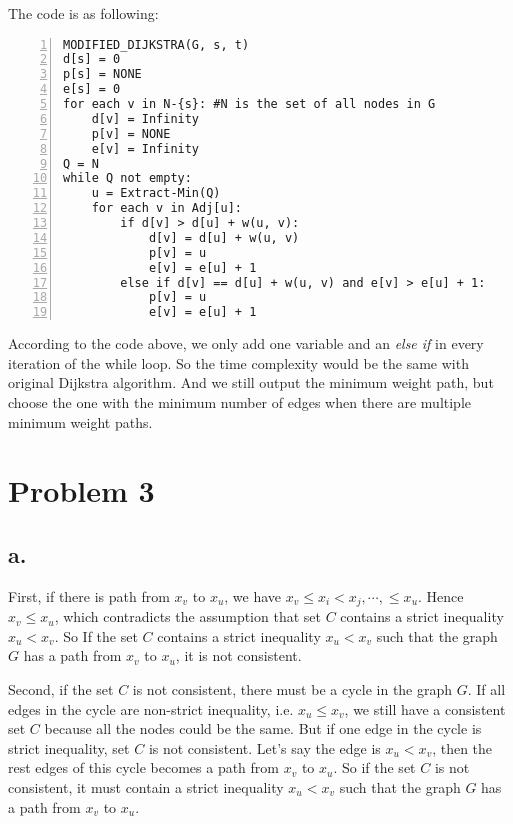\documentclass[twoside,11pt]{homework}
\begin{document}
The code is as following:
\begin{colorboxed}
\begin{lstlisting}[language={[ANSI]C},numbers=left,numberstyle=\tiny, frame=single, title=ModifiedDijkstra, breaklines=true,
   rulesepcolor=\color{red!20!green!20!blue!20},
   keywordstyle=\color{blue!70!black},
   commentstyle=\color{blue!90!},
   basicstyle=\ttfamily]
MODIFIED_DIJKSTRA(G, s, t)
d[s] = 0
p[s] = NONE
e[s] = 0
for each v in N-{s}: #N is the set of all nodes in G
    d[v] = Infinity
    p[v] = NONE
    e[v] = Infinity
Q = N
while Q not empty:
    u = Extract-Min(Q)
    for each v in Adj[u]:
        if d[v] > d[u] + w(u, v):
            d[v] = d[u] + w(u, v)
            p[v] = u
            e[v] = e[u] + 1
        else if d[v] == d[u] + w(u, v) and e[v] > e[u] + 1:
            p[v] = u
            e[v] = e[u] + 1     
\end{lstlisting}
\end{colorboxed}   
According to the code above, we only add one variable and an \textit{else if} in every iteration of the while loop.
So the time complexity would be the same with original Dijkstra algorithm.
And we still output the minimum weight path, but choose the one with the minimum number of edges when there are multiple minimum weight paths.


\section*{Problem 3}
\subsection*{a.}
First, if there is path from $x_v$ to $x_u$, we have $x_v \le x_i < x_j, \cdots, \le x_u$.
Hence $x_v \le x_u$, which contradicts the assumption that set $C$ contains a strict inequality $x_u < x_v$.
So If the set $C$ contains a strict inequality $x_u < x_v$ such that the graph $G$ has a path from $x_v$ to $x_u$, it is not consistent.

Second, if the set $C$ is not consistent, there must be a cycle in the graph $G$.
If all edges in the cycle are non-strict inequality, i.e. $x_u \le x_v$, we still have a consistent set $C$ because all the nodes could be the same.
But if one edge in the cycle is strict inequality, set $C$ is not consistent.
Let's say the edge is $x_u < x_v$, then the rest edges of this cycle becomes a path from $x_v$ to $x_u$.
So if the set $C$ is not consistent, it must contain a strict inequality $x_u < x_v$ such that the graph $G$ has a path from $x_v$ to $x_u$.
\end{document}
